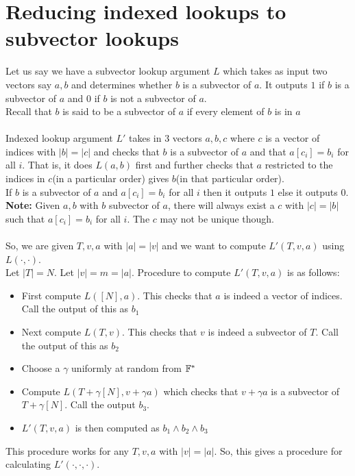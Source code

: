 \section{Reducing indexed lookups to subvector lookups}
Let us say we have a subvector lookup argument $L$ which takes as input two vectors say $a, b$ and determines whether $b$ is a subvector of $a$. It outputs $1$ if $b$ is a subvector of $a$ and $0$ if $b$ is not a subvector of $a$. \\
Recall that $b$ is said to be a subvector of $a$ if every element of $b$ is in $a$\\\\


Indexed lookup argument $L'$ takes in 3 vectors $a, b, c$ where $c$ is a vector of indices with $|b|=|c|$ and checks that $b$ is a subvector of $a$ and that $a[c_i]=b_i$ for all $i$. That is, it does $L(a, b)$ first and further checks that $a$ restricted to the indices in $c$(in a particular order) gives $b$(in that particular order).\\
If $b$ is a subvector of $a$ and $a[c_i]=b_i$ for all $i$ then it outputs $1$ else it outputs $0$.\\

\textbf{Note:} Given $a,b$ with $b$ subvector of $a$, there will always exist a $c$ with $|c|=|b|$ such that $a[c_i]=b_i$ for all $i$. The $c$ may not be unique though. \\\\
So, we are given $T, v, a$ with $|a|=|v|$ and we want to compute $L'(T, v, a)$ using $L(\cdot, \cdot)$. \\
Let $|T|=N$. Let $|v|=m=|a|$.
Procedure to compute $L'(T, v, a)$ is as follows:
\begin{itemize}
    \item First compute $L([N], a)$. This checks that $a$ is indeed a vector of indices. Call the output of this as $b_1$
    \item Next compute $L(T, v)$. This checks that $v$ is indeed a subvector of $T$. Call the output of this as $b_2$
    \item Choose a $\gamma$ uniformly at random from $\mathbb{F}^*$
    \item Compute $L(T+\gamma[N], v+\gamma a)$ which checks that $v+\gamma a$ is a subvector of $T+\gamma [N]$. Call the output $b_3$.
    \item $L'(T, v, a)$ is then computed as $b_1 \wedge b_2 \wedge b_3$
\end{itemize}
This procedure works for any $T,v,a$ with $|v|=|a|$. So, this gives a procedure for calculating $L'(\cdot, \cdot, \cdot)$.

